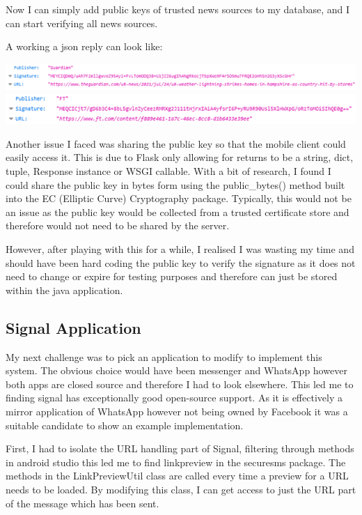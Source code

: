 \documentclass[11pt,a4paper]{report}
\begin{document}
Now I can simply add public keys of trusted news sources to my database, and I can start verifying all news sources.

A working a json reply can look like:
\begin{center}
\includegraphics[width=1\textwidth]{image/json1.png}
\includegraphics[width=1\textwidth]{image/json2.png}
\end{center}

Another issue I faced was sharing the public key so that the mobile client could easily access it. This is due to Flask only allowing for returns to be a string, dict, tuple, Response instance or WSGI callable. With a bit of research, I found I could share the public key in bytes form using the public\_bytes() method built into the EC (Elliptic Curve) Cryptography package. Typically, this would not be an issue as the public key would be collected from a trusted certificate store and therefore would not need to be shared by the server.

However, after playing with this for a while, I realised I was wasting my time and should have been hard coding the public key to verify the signature as it does not need to change or expire for testing purposes and therefore can just be stored within the java application.
\newpage
\subsection{Signal Application}
My next challenge was to pick an application to modify to implement this system. The obvious choice would have been messenger and WhatsApp however both apps are closed source and therefore I had to look elsewhere. This led me to finding signal \citep{Signal} has exceptionally good open-source support. As it is effectively a mirror application of WhatsApp however not being owned by Facebook it was a suitable candidate to show an example implementation.

First, I had to isolate the URL handling part of Signal, filtering through methods in android studio this led me to find linkpreview in the securesms package. The methods in the LinkPreviewUtil class are called every time a preview for a URL needs to be loaded. By modifying this class, I can get access to just the URL part of the message which has been sent.
\end{document}
